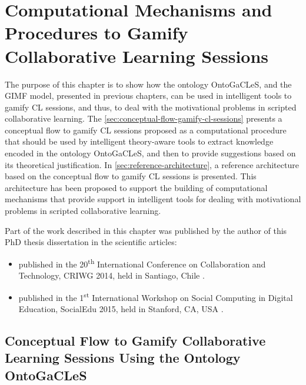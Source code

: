 \chapter[Computational Mechanisms and Procedures to Gamify CL Sessions]{Computational Mechanisms and Procedures to Gamify Collaborative Learning Sessions}
\label{chapter:computer-based-mechanisms-procedures}

The purpose of this chapter is to show how the ontology OntoGaCLeS, and the GIMF model, presented in previous chapters, can be used in intelligent tools to gamify CL sessions, and thus, to deal with the motivational problems in scripted collaborative learning.
The \autoref{sec:conceptual-flow-gamify-cl-sessions} presents a conceptual flow to gamify CL sessions proposed as a computational procedure that should be used by intelligent theory-aware tools to extract knowledge encoded in the ontology OntoGaCLeS, and then to provide suggestions based on its theoretical justification.
In \autoref{sec:reference-architecture}, a reference architecture based on the conceptual flow to gamify CL sessions is presented.
This architecture has been proposed to support the building of computational mechanisms that provide support in intelligent tools for dealing with motivational problems in scripted collaborative learning.

Part of the work described in this chapter was published by the author of this PhD thesis dissertation in the scientific
articles:

\begin{itemize}
\item {} published in the 20\textsuperscript{th} International Conference on Collaboration and Technology, CRIWG 2014, held in Santiago, Chile \cite{ChallcoMoreiraMizoguchiIsotani2014}.

\item {} published in the 1\textsuperscript{st} International Workshop on Social Computing in Digital Education, SocialEdu 2015, held in Stanford, CA, USA \cite{ChallcoMizoguchiBittencourtIsotani2016}.
\end{itemize}

\section[Conceptual Flow to Gamify CL Sessions Using the Ontology OntoGaCLeS]{Conceptual Flow to Gamify Collaborative Learning Sessions Using the Ontology OntoGaCLeS}
\label{sec:conceptual-flow-gamify-cl-sessions}


